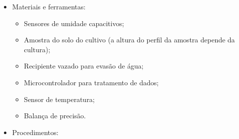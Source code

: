 		\begin{itemize}
			\item Materiais e ferramentas:

			\begin{itemize}
				\item Sensores de umidade capacitivos;
				\item Amostra do solo do cultivo (a altura do perfil da amostra depende da cultura);
				\item Recipiente vazado para evasão de água;
				\item Microcontrolador para tratamento de dados;
				\item Sensor de temperatura;
				\item Balança de precisão.
			\end{itemize}

		\item Procedimentos:


\end{itemize}
